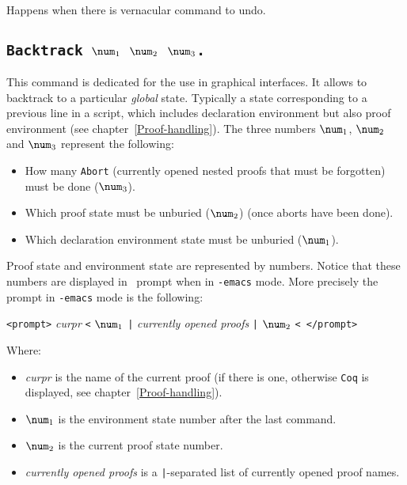 \begin{ErrMsgs}
\item {} \\
  Happens when there is vernacular command to undo.
\end{ErrMsgs}

\subsection[\tt Backtrack $\num_1$ $\num_2$ $\num_3$.]{\tt Backtrack $\num_1$ $\num_2$ $\num_3$.}

This command is dedicated for the use in graphical interfaces.  It
allows to backtrack to a particular \emph{global} state. Typically a
state corresponding to a previous line in a script, which includes
declaration environment but also proof environment (see
chapter~\ref{Proof-handling}). The three numbers $\num_1$, $\num_2$
and $\num_3$ represent the following:
\begin{itemize}
\item How many \texttt{Abort} (currently opened nested proofs that must
  be forgotten) must be done ($\num_3$). 
\item Which proof state must be unburied ($\num_2$) (once aborts have
  been done).
\item Which declaration environment state must be unburied ($\num_1$).
\end{itemize}

Proof state and environment state are represented by numbers. Notice
that these numbers are displayed in \Coq\ prompt when in
\texttt{-emacs} mode. More precisely the prompt in \texttt{-emacs}
mode is the following:

\verb!<prompt>! \emph{curpr} \verb!<! $\num_1$
\verb!|! \emph{currently opened proofs}
\verb!|! $\num_2$ \verb!< </prompt>!

Where:

\begin{itemize}
\item \emph{curpr} is the name of the current proof (if there is
  one, otherwise \texttt{Coq} is displayed, see
chapter~\ref{Proof-handling}).
\item $\num_1$ is the environment state number after the last
  command.
\item $\num_2$ is the current proof state number.
\item \emph{currently opened proofs} is a \verb!|!-separated list of
  currently opened  proof names.
\end{itemize}

